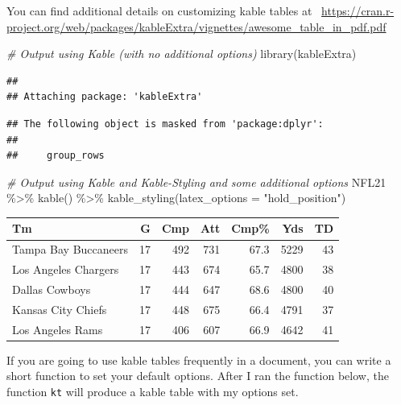 \documentclass[
  11pt,
]{book}
\newenvironment{Shaded}{\begin{snugshade}}{\end{snugshade}}
\newcommand{\AttributeTok}[1]{\textcolor[rgb]{0.77,0.63,0.00}{#1}}
\newcommand{\CommentTok}[1]{\textcolor[rgb]{0.56,0.35,0.01}{\textit{#1}}}
\newcommand{\FunctionTok}[1]{\textcolor[rgb]{0.00,0.00,0.00}{#1}}
\newcommand{\NormalTok}[1]{#1}
\newcommand{\SpecialCharTok}[1]{\textcolor[rgb]{0.00,0.00,0.00}{#1}}
\newcommand{\StringTok}[1]{\textcolor[rgb]{0.31,0.60,0.02}{#1}}
\theoremstyle{definition}
\theoremstyle{definition}
\theoremstyle{definition}
\theoremstyle{definition}
\theoremstyle{remark}
\begin{document}
You can find additional details on customizing kable tables at ~\url{https://cran.r-project.org/web/packages/kableExtra/vignettes/awesome_table_in_pdf.pdf}

\begin{Shaded}
\begin{Highlighting}[]
\CommentTok{\# Output using Kable (with no additional options)}
\FunctionTok{library}\NormalTok{(kableExtra)}
\end{Highlighting}
\end{Shaded}

\begin{verbatim}
## 
## Attaching package: 'kableExtra'
\end{verbatim}

\begin{verbatim}
## The following object is masked from 'package:dplyr':
## 
##     group_rows
\end{verbatim}

\begin{Shaded}
\begin{Highlighting}[]
\CommentTok{\# Output using Kable and Kable{-}Styling and some additional options}
\NormalTok{NFL21 }\SpecialCharTok{\%\textgreater{}\%}
    \FunctionTok{kable}\NormalTok{() }\SpecialCharTok{\%\textgreater{}\%}
    \FunctionTok{kable\_styling}\NormalTok{(}\AttributeTok{latex\_options =} \StringTok{"hold\_position"}\NormalTok{)}
\end{Highlighting}
\end{Shaded}

\begin{table}[!h]
\centering
\begin{tabular}{l|r|r|r|r|r|r}
\hline
Tm & G & Cmp & Att & Cmp\% & Yds & TD\\
\hline
Tampa Bay Buccaneers & 17 & 492 & 731 & 67.3 & 5229 & 43\\
\hline
Los Angeles Chargers & 17 & 443 & 674 & 65.7 & 4800 & 38\\
\hline
Dallas Cowboys & 17 & 444 & 647 & 68.6 & 4800 & 40\\
\hline
Kansas City Chiefs & 17 & 448 & 675 & 66.4 & 4791 & 37\\
\hline
Los Angeles Rams & 17 & 406 & 607 & 66.9 & 4642 & 41\\
\hline
\end{tabular}
\end{table}

\vfill
\newpage

If you are going to use kable tables frequently in a document, you can write a short function to set your default options. After I ran the function below, the function \texttt{kt} will produce a kable table with my options set.
\end{document}
